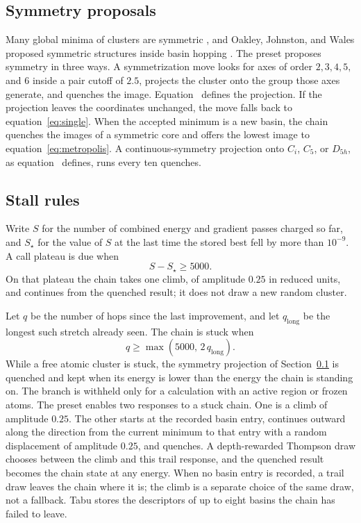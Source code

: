 \documentclass[journal=jctcce,manuscript=article]{achemso}
\begin{document}
\subsection{Symmetry proposals}
\label{sec:symmetry}
Many global minima of clusters are symmetric \cite{wales1997}, and
Oakley, Johnston, and Wales proposed symmetric structures inside basin
hopping \cite{oakley2013}.
The preset proposes symmetry in three ways.
A symmetrization move looks for axes of order \(2, 3, 4, 5,\) and \(6\)
inside a pair cutoff of \(2.5\), projects the cluster onto the group
those axes generate, and quenches the image.
Equation~ defines the projection.
If the projection leaves the coordinates unchanged, the move falls back
to equation~\ref{eq:single}.
When the accepted minimum is a new basin, the chain quenches the images
of a symmetric core and offers the lowest image to
equation~\ref{eq:metropolis}.
A continuous-symmetry projection onto \(C_i\), \(C_5\), or \(D_{5h}\), as
equation~ defines, runs every ten quenches.
\cite{oakley2013}

\subsection{Stall rules}
\label{sec:stall}
Write \(S\) for the number of combined energy and gradient passes charged so far, and
\(S_{\star}\) for the value of \(S\) at the last time the stored best
fell by more than \(10^{-9}\).
A call plateau is due when
\begin{equation}
S - S_{\star} \ge 5000.
\label{eq:plateau}
\end{equation}
On that plateau the chain takes one climb, of amplitude \(0.25\) in reduced
units, and continues from the quenched result; it does not draw a new random
cluster.

Let \(q\) be the number of hops since the last improvement, and let
\(q_{\mathrm{long}}\) be the longest such stretch already seen.
The chain is stuck when
\begin{equation}
q \ge \max(5000,\, 2\, q_{\mathrm{long}}).
\label{eq:stuck}
\end{equation}
While a free atomic cluster is stuck, the symmetry projection of
Section~\ref{sec:symmetry} is quenched and kept when its energy is lower than
the energy the chain is standing on.
The branch is withheld only for a calculation with an active region or
frozen atoms.
The preset enables two responses to a stuck chain.
One is a climb of amplitude \(0.25\).
The other starts at the recorded basin entry, continues outward along the
direction from the current minimum to that entry with a random displacement
of amplitude \(0.25\), and quenches.
A depth-rewarded Thompson draw chooses between the climb and this trail
response, and the quenched result becomes the chain state at any energy.
When no basin entry is recorded, a trail draw leaves the chain where it is;
the climb is a separate choice of the same draw, not a fallback.
Tabu stores the descriptors of up to eight basins the chain has failed
to leave.
\end{document}
